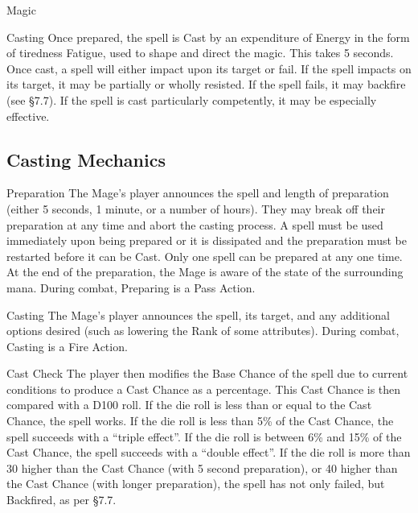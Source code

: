 \begin{Chapter}{Magic}
\begin{Description}
\item[Casting] Once prepared, the spell is Cast by an expenditure of
  Energy in the form of tiredness Fatigue, used to shape and direct
  the magic.  This takes 5 seconds.  Once cast, a spell will either
  impact upon its target or fail.  If the spell impacts on its target,
  it may be partially or wholly resisted.  If the spell fails, it may
  backfire (see §7.7).  If the spell is cast particularly competently,
  it may be especially effective.
\end{Description}

\subsection{Casting Mechanics}

\begin{Description}

\item[Preparation] The Mage’s player announces the spell and length of
  preparation (either 5 seconds, 1 minute, or a number of hours). They
  may break off their preparation at any time and abort the casting
  process.  A spell must be used immediately upon being prepared or it
  is dissipated and the preparation must be restarted before it can be
  Cast.  Only one spell can be prepared at any one time.  At the end
  of the preparation, the Mage is aware of the state of the
  surrounding mana.  During combat, Preparing is a Pass Action.

\item[Casting] The Mage’s player announces the spell, its target, and
  any additional options desired (such as lowering the Rank of some
  attributes).  During combat, Casting is a Fire Action.

\item[Cast Check] The player then modifies the Base Chance of the
  spell due to current conditions to produce a Cast Chance as a
  percentage.  This Cast Chance is then compared with a D100 roll.  If
  the die roll is less than or equal to the Cast Chance, the spell
  works.  If the die roll is less than 5\% of the Cast Chance, the
  spell succeeds with a “triple effect”.  If the die roll is between
  6\% and 15\% of the Cast Chance, the spell succeeds with a “double
  effect”.  If the die roll is more than 30 higher than the Cast
  Chance (with 5 second preparation), or 40 higher than the Cast
  Chance (with longer preparation), the spell has not only failed, but
  Backfired, as per §7.7.


\end{Description}
\end{Chapter}
